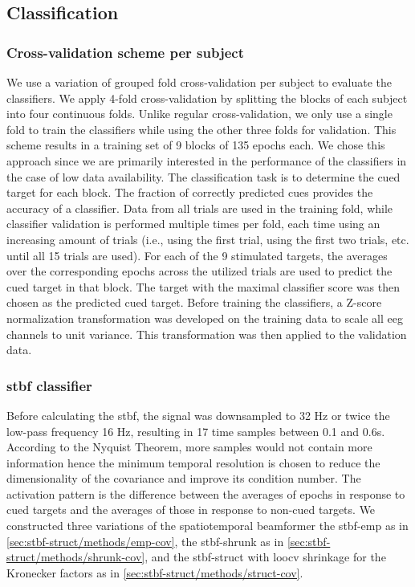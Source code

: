 	\subsection{Classification}
	\subsubsection{Cross-validation scheme per subject}
	We use a variation of grouped fold cross-validation per subject to evaluate the classifiers.
	We apply 4-fold cross-validation by splitting the blocks of each subject into
	four continuous folds.
	Unlike regular cross-validation, we only use a single fold to train the
	classifiers while using the other three folds for validation.
	This scheme results in a training set of 9 blocks of 135 epochs each.
	We chose this approach since we are primarily interested in the performance of the classifiers in the case of low data availability.
	The classification task is to determine the cued target for each block.
	The fraction of correctly predicted cues provides the accuracy of a classifier.
	Data from all trials are used in the training fold, while classifier validation
	is performed multiple times per fold, each time using an increasing amount of
	trials (i.e., using the first trial, using the first two trials, etc. until all 15 trials
	are used).
	For each of the 9 stimulated targets, the averages over the corresponding epochs across
	the utilized trials are used to predict the cued target in that block.
	The target with the maximal classifier score was then chosen as the predicted
	cued target.
	Before training the classifiers, a Z-score normalization transformation was
	developed on the training data to scale all \ac{eeg} channels to unit variance.
	This transformation was then applied to the validation data.

  \subsubsection{\Acl{stbf} classifier}
	Before calculating the \ac{stbf}, the signal was downsampled to
	32 Hz or twice the low-pass frequency 16 Hz, resulting in 17 time samples
	between 0.1 and 0.6s. According to the Nyquist Theorem, more samples would not
	contain more information hence the minimum temporal resolution is chosen to reduce
	the dimensionality of the covariance and improve its condition number.
	The activation pattern is the difference between the averages of epochs in response to cued targets and the averages of those in response to non-cued targets.
	We constructed three variations of the spatiotemporal beamformer the \ac{stbf-emp} as in
	\cref{sec:stbf-struct/methods/emp-cov}, the \ac{stbf-shrunk} as in
	\cref{sec:stbf-struct/methods/shrunk-cov}, and the \ac{stbf-struct} with \ac{loocv} shrinkage for
	the Kronecker factors as in \cref{sec:stbf-struct/methods/struct-cov}.

